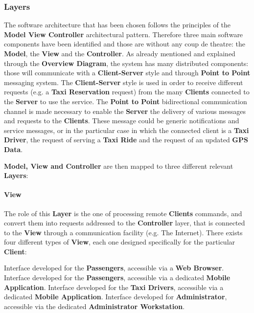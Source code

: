 \subsubsection{Layers}
The software architecture that has been chosen follows the principles of the \textbf{Model View Controller} architectural pattern.
Therefore three main software components have been identified and those are without any coup de theatre: the \textbf{Model}, the \textbf{View} and the \textbf{Controller}.
As already mentioned and explained through the \textbf{Overview Diagram}, the system has many distributed components: those will communicate with a \textbf{Client-Server} style and through \textbf{Point to Point} messaging system.
The \textbf{Client-Server} style is used in order to receive different requests (e.g. a \textbf{Taxi Reservation} request) from the many \textbf{Clients} connected to the \textbf{Server} to use the service.
The \textbf{Point to Point} bidirectional communication channel is made necessary to enable the \textbf{Server} the delivery of various messages and requests to the \textbf{Clients}.
These message could be generic notifications and service messages, or in the particular case in which the connected client is a \textbf{Taxi Driver}, the request of serving a \textbf{Taxi Ride} and the request of an updated \textbf{GPS Data}.

\textbf{Model, View and Controller} are then mapped to three different relevant \textbf{Layers}:

\paragraph{View}
The role of this \textbf{Layer} is the one of processing remote \textbf{Clients} commands, and convert them into requests addressed to the \textbf{Controller} layer, that is connected to the \textbf{View} through a communication facility (e.g. The Internet).
There exists four different types of \textbf{View}, each one designed specifically for the particular \textbf{Client}:
\begin{itemize}
	 Interface developed for the \textbf{Passengers}, accessible via a \textbf{Web Browser}.
	 Interface developed for the \textbf{Passengers}, accessible via a dedicated \textbf{Mobile Application}.
	 Interface developed for the \textbf{Taxi Drivers}, accessible via a dedicated \textbf{Mobile Application}.
	 Interface developed for \myTaxiService{} \textbf{Administrator}, accessible via the dedicated \textbf{Administrator Workstation}.
\end{itemize}

